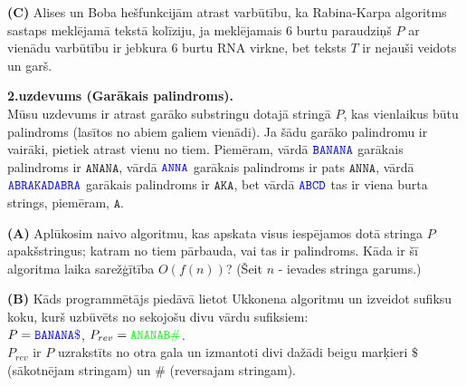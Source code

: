 \documentclass[a4paper]{article}
\begin{document}
\vspace{5pt}
{\bf (C)} Alises un Boba hešfunkcijām atrast varbūtību, ka 
Rabina-Karpa algoritms sastaps meklējamā tekstā kolīziju, ja meklējamais 
$6$ burtu paraudziņš $P$ ar vienādu varbūtību ir 
jebkura $6$ burtu RNA virkne, bet teksts $T$ ir nejauši veidots un garš. 






\vspace{20pt}
{\bf 2.uzdevums (Garākais palindroms).}\\

Mūsu uzdevums ir atrast garāko substringu do\-ta\-jā stringā $P$, kas vienlaikus būtu 
palindroms (lasītos no abiem galiem vienādi). Ja šādu garāko palindromu ir vairāki, 
pietiek atrast vienu no tiem.
Piemēram, vārdā $\textcolor{blue}{\mathtt{BANANA}}$ garākais palindroms ir $\mathtt{ANANA}$, 
vārdā $\textcolor{blue}{\mathtt{ANNA}}$ garākais palindroms ir pats $\mathtt{ANNA}$, 
vārdā $\textcolor{blue}{\mathtt{ABRAKADABRA}}$ garākais palindroms ir $\mathtt{AKA}$, 
bet vārdā  $\textcolor{blue}{\mathtt{ABCD}}$ tas ir viena burta strings, piemēram, $\mathtt{A}$.

\vspace{5pt}
{\bf (A)} Aplūkosim naivo algoritmu, kas apskata visus iespējamos dotā stringa $P$ apakšstringus; 
katram no tiem pārbauda, vai tas ir palindroms. 
Kāda ir šī algoritma laika sarežģītība $O(f(n))$? (Šeit $n$ - ievades stringa garums.)



\vspace{5pt}
{\bf (B)}
Kāds programmētājs piedāvā lietot Ukkonena algoritmu un izveidot sufiksu
koku, kurš uzbūvēts no sekojošu divu vārdu sufiksiem:\\
$P = \textcolor{blue}{\mathtt{BANANA\$}}$, 
$P_{rev} = \textcolor{green}{\mathtt{ANANAB\#}}$.\\
$P_{rev}$ ir $P$ uzrakstīts no otra gala un izmantoti divi dažādi beigu marķieri 
$\texttt{\$}$ (sākotnējam stringam) un $\texttt{\#}$ (reversajam stringam). 
\end{document}
